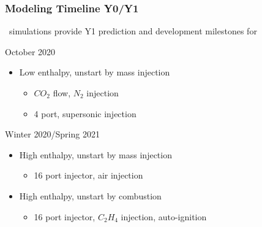 \documentclass{beamer}
\begin{document}
\begin{frame}\frametitle{Modeling Timeline Y0/Y1}
 \PCtwo~simulations provide Y1 prediction and development milestones for \ceesdcode

\hfill

 October 2020
\begin{itemize}
	\item Low enthalpy, unstart by mass injection
	\begin{itemize}
	\item $CO_2$ flow, $N_2$ injection
	\item 4 port, supersonic injection
	\end{itemize}
\end{itemize}

 Winter 2020/Spring 2021
\begin{itemize}
\item High enthalpy, unstart by mass injection
\begin{itemize}
\item 16 port injector, air injection
\end{itemize}
\item High enthalpy, unstart by combustion
\begin{itemize}
\item 16 port injector, $C_2H_4$ injection, auto-ignition
\end{itemize}
\end{itemize}


\end{frame}
\end{document}
